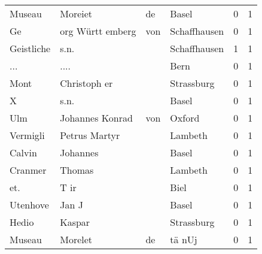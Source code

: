 \documentclass[10pt,a4paper,landscape]{article}
\begin{document}
\begin{longtable}{llllrr}
                   Museau &                            Moreiet &          de &                                       Basel &          0 &         1 \\
                       Ge &                  org  Württ emberg &         von &                                Schaffhausen &          0 &         1 \\
               Geistliche &                               s.n. &             &                                Schaffhausen &          1 &         1 \\
                      ... &                               .... &             &                                        Bern &          0 &         1 \\
                     Mont &                       Christoph er &             &                                  Strassburg &          0 &         1 \\
                        X &                               s.n. &             &                                       Basel &          0 &         1 \\
                      Ulm &                    Johannes Konrad &         von &                                      Oxford &          0 &         1 \\
                 Vermigli &                      Petrus Martyr &             &                                     Lambeth &          0 &         1 \\
                   Calvin &                           Johannes &             &                                       Basel &          0 &         1 \\
                  Cranmer &                             Thomas &             &                                     Lambeth &          0 &         1 \\
                      et. &                               T ir &             &                                        Biel &          0 &         1 \\
                 Utenhove &                              Jan J &             &                                       Basel &          0 &         1 \\
                    Hedio &                             Kaspar &             &                                  Strassburg &          0 &         1 \\
                   Museau &                            Morelet &          de &                                      tä nUj &          0 &         1 \\

\end{longtable}
\end{document}

